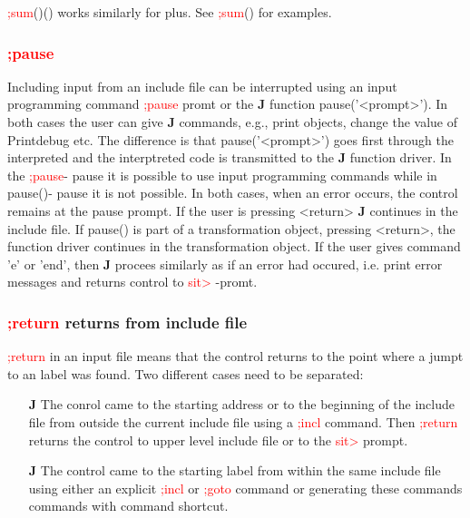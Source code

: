 \begin{note}
\textcolor{Red}{;sum}()() works similarly for plus. See \textcolor{Red}{;sum}() for examples.
\end{note}
\subsubsection{\textcolor{Red}{;pause}}
\label{inpupause}
Including input from an include file can be interrupted using an input programming
command \textcolor{Red}{;pause} promt or the \textbf{J} function \textcolor{VioletRed}{pause}('<prompt>'). In both cases
the user can give \textbf{J} commands, e.g., print objects, change the value of Printdebug etc.
The difference is that  \textcolor{VioletRed}{pause}('<prompt>') goes first through the interpreted and the interptreted
code is transmitted to the \textbf{J} function driver. In the \textcolor{Red}{;pause}- pause it is possible to
use input programming commands while in \textcolor{VioletRed}{pause}()- pause it is not possible. In both cases, when
an error occurs, the control remains at the pause prompt. If the user is pressing
<return> \textbf{J} continues in the include file. If \textcolor{VioletRed}{pause}() is part of a transformation object,
pressing <return>, the function driver continues in the transformation object.
If the user gives command 'e' or 'end', then \textbf{J} procees similarly as if an error had occured,
i.e. print error messages and returns control to \textcolor{Red}{sit>} -promt.
\subsubsection{\textcolor{Red}{;return} returns from include file}
\label{inpureturn}
\textcolor{Red}{;return} in an input file means that the control returns to the point where a
jumpt to an label was found. Two different cases need to be separated:
\begin{itemize}
\item[\textbf{J}] The conrol came to the starting address or to the beginning of the include file
from outside the current include file using a \textcolor{Red}{;incl} command. Then \textcolor{Red}{;return} returns the control to upper level include
file or to the \textcolor{Red}{sit>} prompt.
\item[\textbf{J}] The control came to the starting label from within the same include file using
either an explicit \textcolor{Red}{;incl} or \textcolor{Red}{;goto} command or generating these commands commands
with command shortcut.
\end{itemize}
